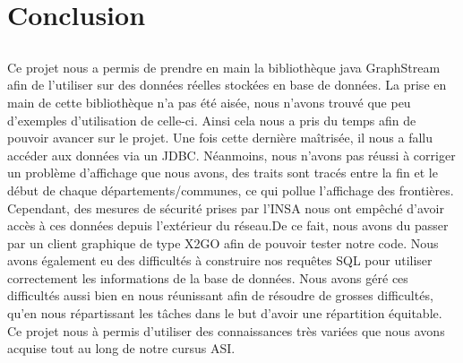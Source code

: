 \chapter{Conclusion}
\section*{}
Ce projet nous a permis de prendre en main la bibliothèque java GraphStream afin de l'utiliser sur des données réelles stockées en base de données.
La prise en main de cette bibliothèque n'a pas été aisée, nous n'avons trouvé que peu d'exemples d'utilisation de celle-ci. Ainsi cela nous a pris du temps afin de pouvoir avancer sur le projet.
Une fois cette dernière maîtrisée, il nous a fallu accéder aux données via un JDBC. Néanmoins, nous n'avons pas réussi à corriger un problème d'affichage que nous avons, des traits sont tracés entre la fin et le début de chaque départements/communes, ce qui pollue l'affichage des frontières.
Cependant, des mesures de sécurité prises par l'INSA nous ont empêché d'avoir accès à ces données depuis l'extérieur du réseau.De ce fait, nous avons du passer par un client graphique de type X2GO afin de pouvoir tester notre code.
Nous avons également eu des difficultés à construire nos requêtes SQL pour utiliser correctement les informations de la base de données.
Nous avons géré ces difficultés aussi bien en nous réunissant afin de résoudre de grosses difficultés, qu'en nous répartissant les tâches dans le but d'avoir une répartition équitable.
Ce projet nous à permis d'utiliser des connaissances très variées que nous avons acquise tout au long de notre cursus ASI.
\section*{}
